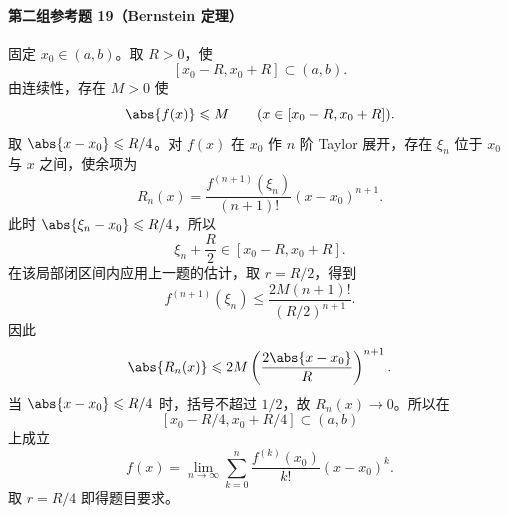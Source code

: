 \paragraph{第二组参考题 19（Bernstein 定理）}
\begin{xsolution}
固定 $x_0\in(a,b)$。取 $R>0$，使
\[
  [x_0-R,x_0+R]\subset(a,b).
\]
由连续性，存在 $M>0$ 使
\[
  \abs{f(x)}\leqslant M
  \qquad(x\in[x_0-R,x_0+R]).
\]
取 $\abs{x-x_0}\leqslant R/4$。对 $f(x)$ 在 $x_0$ 作 $n$ 阶 Taylor 展开，存在 $\xi_n$ 位于 $x_0$ 与 $x$ 之间，使余项为
\[
  R_n(x)=\frac{f^{(n+1)}(\xi_n)}{(n+1)!}(x-x_0)^{n+1}.
\]
此时 $\abs{\xi_n-x_0}\leqslant R/4$，所以
\[
  \xi_n+\frac R2\in[x_0-R,x_0+R].
\]
在该局部闭区间内应用上一题的估计，取 $r=R/2$，得到
\[
  f^{(n+1)}(\xi_n)
  \leqslant\frac{2M(n+1)!}{(R/2)^{n+1}}.
\]
因此
\[
  \abs{R_n(x)}
  \leqslant2M
  \left(\frac{2\abs{x-x_0}}R\right)^{n+1}.
\]
当 $\abs{x-x_0}\leqslant R/4$ 时，括号不超过 $1/2$，故 $R_n(x)\to0$。所以在
\[
  [x_0-R/4,x_0+R/4]\subset(a,b)
\]
上成立
\[
  f(x)=\lim_{n\to\infty}
  \sum_{k=0}^n\frac{f^{(k)}(x_0)}{k!}(x-x_0)^k.
\]
取 $r=R/4$ 即得题目要求。
\end{xsolution}
